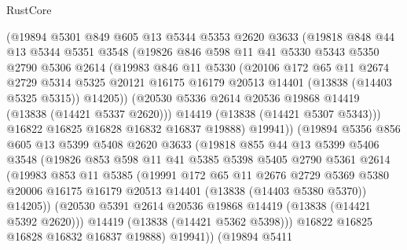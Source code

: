 \begin{lexlean}{RustCore}
\begin{coremodule}
          (@19894
            @5301
            @849
            @605
            @13
            @5344
            @5353
            @2620
            @3633
            (@19818
              @848
              @44
              @13
              @5344
              @5351
              @3548
              (@19826
                @846
                @598
                @11
                @41
                @5330
                @5343
                @5350
                @2790
                @5306
                @2614
                (@19983
                  @846
                  @11
                  @5330
                  (@20106
                    @172
                    @65
                    @11
                    @2674
                    @2729
                    @5314
                    @5325
                    @20121
                    @16175
                    @16179
                    @20513
                    @14401
                    (@13838 (@14403 @5325 @5315))
                    @14205))
                (@20530 @5336 @2614 @20536 @19868 @14419 (@13838 (@14421 @5337 @2620)))
                @14419
                (@13838 (@14421 @5307 @5343)))
              @16822
              @16825
              @16828
              @16832
              @16837
              @19888)
            @19941))
        (@19894
          @5356
          @856
          @605
          @13
          @5399
          @5408
          @2620
          @3633
          (@19818
            @855
            @44
            @13
            @5399
            @5406
            @3548
            (@19826
              @853
              @598
              @11
              @41
              @5385
              @5398
              @5405
              @2790
              @5361
              @2614
              (@19983
                @853
                @11
                @5385
                (@19991
                  @172
                  @65
                  @11
                  @2676
                  @2729
                  @5369
                  @5380
                  @20006
                  @16175
                  @16179
                  @20513
                  @14401
                  (@13838 (@14403 @5380 @5370))
                  @14205))
              (@20530 @5391 @2614 @20536 @19868 @14419 (@13838 (@14421 @5392 @2620)))
              @14419
              (@13838 (@14421 @5362 @5398)))
            @16822
            @16825
            @16828
            @16832
            @16837
            @19888)
          @19941))
      (@19894
        @5411

\end{coremodule}
\end{lexlean}
